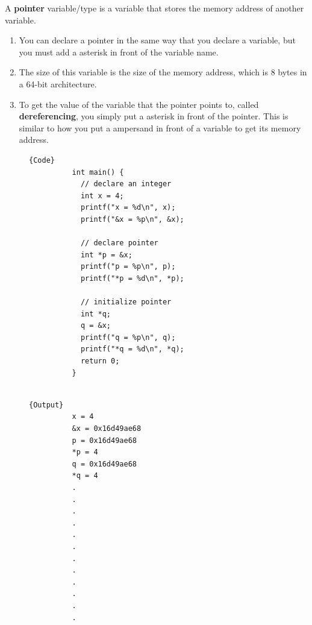 \documentclass{article}
\begin{document}
    \begin{definition}
      A \textbf{pointer} variable/type is a variable that stores the memory address of another variable. 
      \begin{enumerate}
        \item You can declare a pointer in the same way that you declare a variable, but you must add a asterisk in front of the variable name. 
        \item The size of this variable is the size of the memory address, which is 8 bytes in a 64-bit architecture. 
        \item To get the value of the variable that the pointer points to, called \textbf{dereferencing}, you simply put a asterisk in front of the pointer. This is similar to how you put a ampersand in front of a variable to get its memory address. 
      \end{enumerate}

      \begin{figure}[H]
        \centering 
        \noindent\begin{minipage}{.5\textwidth}
        \begin{lstlisting}[]{Code}
          int main() { 
            // declare an integer 
            int x = 4; 
            printf("x = %d\n", x); 
            printf("&x = %p\n", &x); 

            // declare pointer 
            int *p = &x; 
            printf("p = %p\n", p); 
            printf("*p = %d\n", *p); 

            // initialize pointer 
            int *q; 
            q = &x; 
            printf("q = %p\n", q); 
            printf("*q = %d\n", *q); 
            return 0; 
          }
          
        \end{lstlisting}
        \end{minipage}
        \hfill
        \begin{minipage}{.49\textwidth}
        \begin{lstlisting}[]{Output}
          x = 4
          &x = 0x16d49ae68
          p = 0x16d49ae68
          *p = 4
          q = 0x16d49ae68
          *q = 4
          .
          .
          .
          .
          .
          .
          .
          .
          .
          .
          .
          .
        \end{lstlisting}
        \end{minipage}
        \caption{} 
        \label{fig:pointer_variable}
      \end{figure}
    \end{definition}
\end{document}
